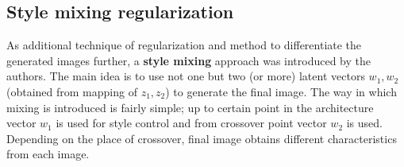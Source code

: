 \documentclass[12pt,a4paper,openany]{book}
\begin{document}
\subsection{Style mixing regularization}

As additional technique of regularization and method to differentiate the generated images further, a \textbf{style mixing} approach was introduced by the authors. The main idea is to use not one but two (or more) latent vectors $w_{1}, w_{2}$ (obtained from mapping of $z_{1}, z_{2}$) to generate the final image. The way in which mixing is introduced is fairly simple; up to certain point in the architecture vector $w_{1}$ is used for style control and from crossover point vector $w_{2}$ is used.
Depending on the place of crossover, final image obtains different characteristics from each image. 
%
%
%
%
%
%


\end{document}
